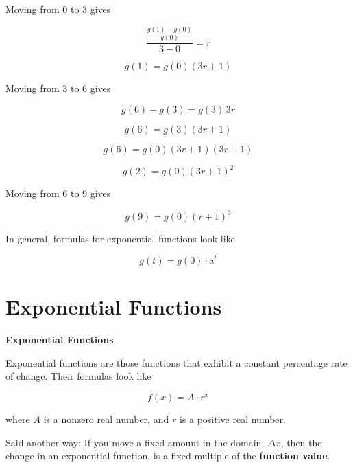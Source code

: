 \documentclass{ximera}
\begin{document}
\begin{procedure}
Moving from $0$ to $3$ gives

\[      \frac{\frac{g(1)-g(0)}{g(0)}}{3-0}  = r  \]

\[      g(1) =  g(0) (3r + 1)  \]



Moving from $3$ to $6$ gives

\[      g(6) - g(3) =  g(3) \, 3r  \]

\[      g(6) =  g(3) (3r + 1)  \]

\[      g(6) =  g(0) (3r + 1) (3r + 1)  \]

\[      g(2) =  g(0) (3r + 1)^2  \]




Moving from $6$ to $9$ gives

\[      g(9) =  g(0) (r + 1)^3  \]

\end{procedure}











In general, formulas for exponential functions look like


\[      g(t) = g(0) \cdot a^t   \]

















\section*{Exponential Functions}


\begin{idea} \textbf{\textcolor{blue!55!black}{Exponential Functions}}

Exponential functions are those functions that exhibit a constant percentage rate of change.  Their formulas look like


\[      f(x) = A \cdot r^x   \]

where $A$ is a nonzero real number, and $r$ is a positive real number.


\end{idea}



Said another way:  If you move a fixed amount in the domain, $\Delta x$, then the change in an exponential function, is a fixed multiple of the \textbf{function value}.
\end{document}
